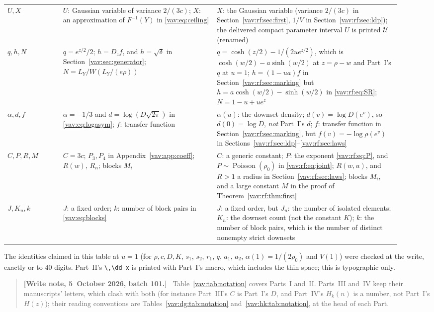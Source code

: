 \documentclass[11pt]{article}
\theoremstyle{remark}\newtheorem{remark}[theorem]{Remark}
\newcommand{\dd}{\,\mathrm d}
\newcommand{\Pois}{\operatorname{Poisson}}
\newenvironment{writenoteb}{\begin{quote}\small\raggedright\textbf{[Write note, 5~October 2026, batch 101.]}\ }{\end{quote}}
\begin{document}
\begin{table}[H]
\begin{tabular}{@{}>{\raggedright}p{0.13\linewidth}>{\raggedright}p{0.36\linewidth}>{\raggedright\arraybackslash}p{0.43\linewidth}@{}}
$U,X$ & $U$: Gaussian variable of variance $2/(3c)$; $X$: an approximation of $F^{-1}(Y)$ in \eqref{vav:eq:ceiling} & $X$: the Gaussian variable (variance $2/(3c)$ in Section~\ref{vav:rf:sec:first}, $1/V$ in Section~\ref{vav:rf:sec:ldp}); the delivered compact parameter interval $U$ is printed $\mathcal U$ (renamed)\\
$q,h,N$ & $q=e^{z/2}/2$; $h=D_zf$, and $h=\sqrt\delta$ in Section~\ref{vav:sec:generator}; $N=L_Y/W(L_Y/(e\rho))$ & $q=\cosh(z/2)-1/(2ue^{z/2})$, which is $\cosh(w/2)-a\sinh(w/2)$ at $z=\rho-w$ and Part~I's $q$ at $u=1$; $h=(1-ua)f$ in Section~\ref{vav:rf:sec:marking} but $h=a\cosh(w/2)-\sinh(w/2)$ in \eqref{vav:rf:eq:SR}; $N=1-u+ue^z$\\
$\alpha,d,f$ & $\alpha=-1/3$ and $d=\log(D\sqrt{2\pi})$ in \eqref{vav:eq:logasym}; $f$: transfer function & $\alpha(u)$: the downset density; $d(v)=\log D(e^v)$, so $d(0)=\log D$, \emph{not} Part~I's $d$; $f$: transfer function in Section~\ref{vav:rf:sec:marking}, but $f(v)=-\log\rho(e^v)$ in Sections~\ref{vav:rf:sec:ldp}--\ref{vav:rf:sec:laws}\\
$C,P,R,M$ & $C=3c$; $P_3,P_4$ in Appendix~\ref{vav:app:coeff}; $R(w)$, $R_n$; blocks $M_i$ & $C$: a generic constant; $P$: the exponent \eqref{vav:rf:eq:P}, and $P\sim\Pois(\rho_0)$ in \eqref{vav:rf:eq:joint}; $R(w,u)$, and $R>1$ a radius in Section~\ref{vav:rf:sec:laws}; blocks $M_i$, and a large constant $M$ in the proof of Theorem~\ref{vav:rf:thm:first}\\
$J,K_n,k$ & $J$: a fixed order; $k$: number of block pairs in \eqref{vav:eq:blocks} & $J$: a fixed order, but $J_n$: the number of isolated elements; $K_n$: the downset count (not the constant $K$); $k$: the number of block pairs, which is the number of distinct nonempty strict downsets\\
\bottomrule
\end{tabular}
\end{table}
The identities claimed in this table at $u=1$ (for $\rho,c,D,K$, $s_1$,
$s_2$, $r_1$, $q$, $a_1$, $a_2$, $\alpha(1)=1/(2\rho_0)$ and $V(1)$) were
checked at the write, exactly or to 40 digits. Part~II's \verb|\,\dd x| is
printed with Part~I's macro, which includes the thin space; this is
typographic only.
\begin{writenoteb}
Table~\ref{vav:tab:notation} covers Parts~I and~II. Parts~III and~IV keep
their manuscripts' letters, which clash with both (for instance Part~III's
$C$ is Part~I's $D$, and Part~IV's $H_k(n)$ is a number, not Part~I's
$H(z)$); their reading conventions are Tables~\ref{vav:dg:tab:notation}
and~\ref{vav:hk:tab:notation}, at the head of each Part.
\end{writenoteb}
\end{document}
